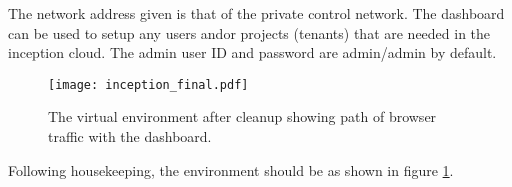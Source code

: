 The network address given is that of the private control network.
The dashboard can be used to setup any users and\/or projects (tenants) that are needed in the inception cloud.
The admin user ID and password are admin/admin by default.

\begin{figure}
  \centering
  \texttt{[image: inception\_final.pdf]}
  \caption{
	\small The virtual environment after cleanup showing path of browser traffic with the dashboard.
  	\label{fg_final}\normalsize
  }
  \normalsize
\end{figure}
Following housekeeping, the environment should be as shown in figure \ref{fg_final}.
